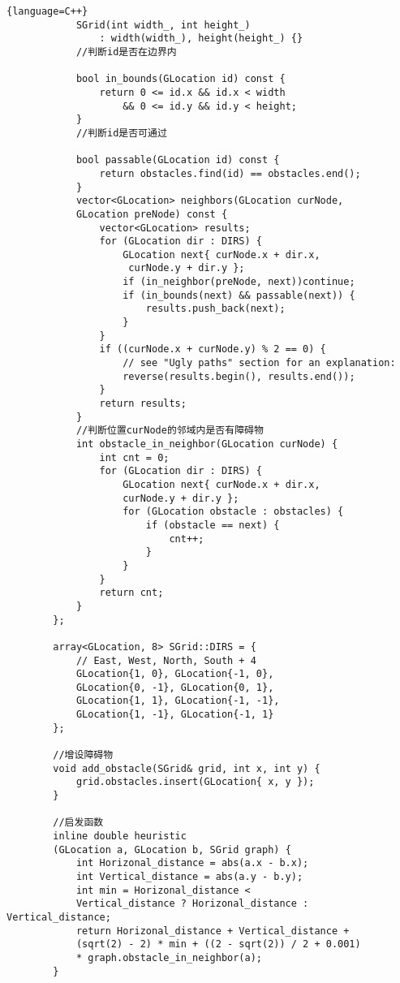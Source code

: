 \documentclass[withoutpreface,bwprint]{cumcmthesis} %
\begin{document}
\begin{appendix}
\begin{lstlisting}{language=C++}
            SGrid(int width_, int height_)
                : width(width_), height(height_) {}
            //判断id是否在边界内
        
            bool in_bounds(GLocation id) const {
                return 0 <= id.x && id.x < width
                    && 0 <= id.y && id.y < height;
            }
            //判断id是否可通过
        
            bool passable(GLocation id) const {
                return obstacles.find(id) == obstacles.end();
            }
            vector<GLocation> neighbors(GLocation curNode, 
            GLocation preNode) const {
                vector<GLocation> results;
                for (GLocation dir : DIRS) {
                    GLocation next{ curNode.x + dir.x,
                     curNode.y + dir.y };
                    if (in_neighbor(preNode, next))continue;
                    if (in_bounds(next) && passable(next)) {
                        results.push_back(next);
                    }
                }
                if ((curNode.x + curNode.y) % 2 == 0) {
                    // see "Ugly paths" section for an explanation:
                    reverse(results.begin(), results.end());
                }
                return results;
            }
            //判断位置curNode的邻域内是否有障碍物
            int obstacle_in_neighbor(GLocation curNode) {
                int cnt = 0;
                for (GLocation dir : DIRS) {
                    GLocation next{ curNode.x + dir.x, 
                    curNode.y + dir.y };
                    for (GLocation obstacle : obstacles) {
                        if (obstacle == next) {
                            cnt++;
                        }
                    }
                }
                return cnt;
            }
        };
        
        array<GLocation, 8> SGrid::DIRS = {
            // East, West, North, South + 4 
            GLocation{1, 0}, GLocation{-1, 0},
            GLocation{0, -1}, GLocation{0, 1},
            GLocation{1, 1}, GLocation{-1, -1},
            GLocation{1, -1}, GLocation{-1, 1}
        };
        
        //增设障碍物
        void add_obstacle(SGrid& grid, int x, int y) {
            grid.obstacles.insert(GLocation{ x, y });
        }
        
        //启发函数
        inline double heuristic
        (GLocation a, GLocation b, SGrid graph) {
            int Horizonal_distance = abs(a.x - b.x);
            int Vertical_distance = abs(a.y - b.y);
            int min = Horizonal_distance < 
            Vertical_distance ? Horizonal_distance : Vertical_distance;
            return Horizonal_distance + Vertical_distance + 
            (sqrt(2) - 2) * min + ((2 - sqrt(2)) / 2 + 0.001) 
            * graph.obstacle_in_neighbor(a);
        }
        

\end{lstlisting}
\end{appendix}
\end{document}
